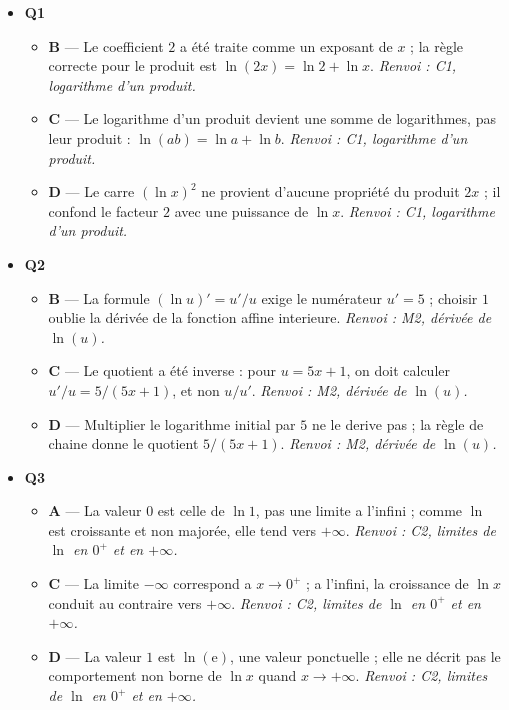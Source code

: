 \begin{itemize}
  \item \textbf{Q1}
  \begin{itemize}
    \item \textbf{B} — Le coefficient $2$ a été traite comme un exposant de $x$ ; la règle correcte pour le produit est $\ln(2x)=\ln 2+\ln x$. \emph{Renvoi : C1, logarithme d'un produit.}
    \item \textbf{C} — Le logarithme d'un produit devient une somme de logarithmes, pas leur produit : $\ln(ab)=\ln a+\ln b$. \emph{Renvoi : C1, logarithme d'un produit.}
    \item \textbf{D} — Le carre $(\ln x)^2$ ne provient d'aucune propriété du produit $2x$ ; il confond le facteur $2$ avec une puissance de $\ln x$. \emph{Renvoi : C1, logarithme d'un produit.}
  \end{itemize}
  \item \textbf{Q2}
  \begin{itemize}
    \item \textbf{B} — La formule $(\ln u)'=u'/u$ exige le numérateur $u'=5$ ; choisir $1$ oublie la dérivée de la fonction affine interieure. \emph{Renvoi : M2, dérivée de $\ln(u)$.}
    \item \textbf{C} — Le quotient a été inverse : pour $u=5x+1$, on doit calculer $u'/u=5/(5x+1)$, et non $u/u'$. \emph{Renvoi : M2, dérivée de $\ln(u)$.}
    \item \textbf{D} — Multiplier le logarithme initial par $5$ ne le derive pas ; la règle de chaine donne le quotient $5/(5x+1)$. \emph{Renvoi : M2, dérivée de $\ln(u)$.}
  \end{itemize}
  \item \textbf{Q3}
  \begin{itemize}
    \item \textbf{A} — La valeur $0$ est celle de $\ln 1$, pas une limite a l'infini ; comme $\ln$ est croissante et non majorée, elle tend vers $+\infty$. \emph{Renvoi : C2, limites de $\ln$ en $0^+$ et en $+\infty$.}
    \item \textbf{C} — La limite $-\infty$ correspond a $x\to0^+$ ; a l'infini, la croissance de $\ln x$ conduit au contraire vers $+\infty$. \emph{Renvoi : C2, limites de $\ln$ en $0^+$ et en $+\infty$.}
    \item \textbf{D} — La valeur $1$ est $\ln(\mathrm e)$, une valeur ponctuelle ; elle ne décrit pas le comportement non borne de $\ln x$ quand $x\to+\infty$. \emph{Renvoi : C2, limites de $\ln$ en $0^+$ et en $+\infty$.}
  \end{itemize}

\end{itemize}
